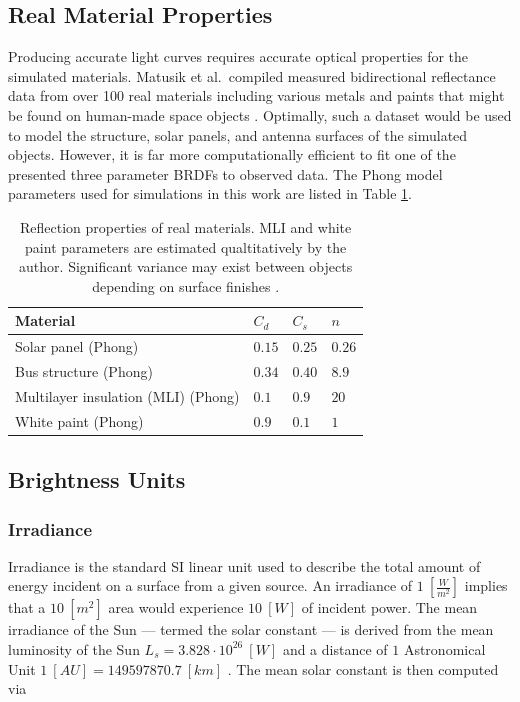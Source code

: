 \subsection{Real Material Properties}

Producing accurate light curves requires accurate optical properties for the simulated materials. Matusik et al.\ compiled measured bidirectional reflectance data from over 100 real materials including various metals and paints that might be found on human-made space objects \cite{matusik2003}. Optimally, such a dataset would be used to model the structure, solar panels, and antenna surfaces of the simulated objects. However, it is far more computationally efficient to fit one of the presented three parameter BRDFs to observed data. The Phong model parameters used for simulations in this work are listed in Table \ref{tb:real_matprops}.

\begin{table}[]
  \centering
  \begin{tabular}{|l|l|l|l|}
  \hline
  \textbf{Material} & $C_d$ & $C_s$ & $n$ \\ \hline
  Solar panel (Phong) \cite{fankhauser2023}              & $0.15$ & $0.25$ & $0.26$  \\ \hline
  Bus structure (Phong) \cite{fankhauser2023}               & $0.34$ & $0.40$ & $8.9$  \\ \hline
  Multilayer insulation (MLI) (Phong) & $0.1$ & $0.9$ & $20$ \\ \hline
  White paint (Phong) & $0.9$ & $0.1$ & $1$ \\ \hline
  \end{tabular}
  \caption{Reflection properties of real materials. MLI and white paint parameters are estimated qualtitatively by the author. Significant variance may exist between objects depending on surface finishes \cite{matusik2003}.}
  \label{tb:real_matprops}
\end{table}

\subsection{Brightness Units}

\subsubsection{Irradiance}

Irradiance is the standard SI linear unit used to describe the total amount of energy incident on a
surface from a given source. An irradiance of $1 \: \left[ \frac{W}{m^2} \right]$ implies that a $10
\: [m^2]$ area would experience $10 \: [W]$ of incident power. The mean irradiance of the Sun --- termed the solar constant --- is derived from the mean luminosity of the Sun $L_s = 3.828\cdot10^{26} \: [W]$ and a distance of $1$ Astronomical Unit $1 \: [AU] = 149597870.7 \: [km]$ \cite{frueh2019notes}. The mean solar constant is then computed via

